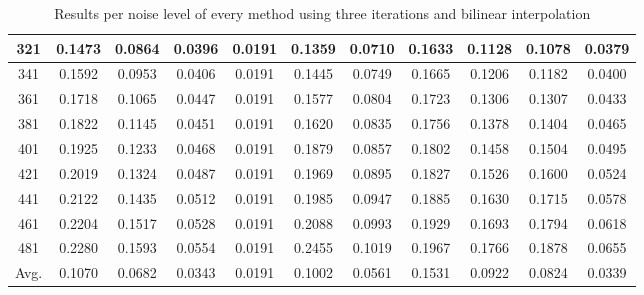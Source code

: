 \begin{table}[ht!]
\begin{tabular}{c|c|c|c|c|c|c|c|c|c|c}
321 & 0.1473 & 0.0864 & 0.0396 & 0.0191 & 0.1359 & 0.0710 & 0.1633 & 0.1128 & 0.1078 & 0.0379 \\ \hline
341 & 0.1592 & 0.0953 & 0.0406 & 0.0191 & 0.1445 & 0.0749 & 0.1665 & 0.1206 & 0.1182 & 0.0400 \\ \hline
361 & 0.1718 & 0.1065 & 0.0447 & 0.0191 & 0.1577 & 0.0804 & 0.1723 & 0.1306 & 0.1307 & 0.0433 \\ \hline
381 & 0.1822 & 0.1145 & 0.0451 & 0.0191 & 0.1620 & 0.0835 & 0.1756 & 0.1378 & 0.1404 & 0.0465 \\ \hline
401 & 0.1925 & 0.1233 & 0.0468 & 0.0191 & 0.1879 & 0.0857 & 0.1802 & 0.1458 & 0.1504 & 0.0495 \\ \hline
421 & 0.2019 & 0.1324 & 0.0487 & 0.0191 & 0.1969 & 0.0895 & 0.1827 & 0.1526 & 0.1600 & 0.0524 \\ \hline
441 & 0.2122 & 0.1435 & 0.0512 & 0.0191 & 0.1985 & 0.0947 & 0.1885 & 0.1630 & 0.1715 & 0.0578 \\ \hline
461 & 0.2204 & 0.1517 & 0.0528 & 0.0191 & 0.2088 & 0.0993 & 0.1929 & 0.1693 & 0.1794 & 0.0618 \\ \hline
481 & 0.2280 & 0.1593 & 0.0554 & 0.0191 & 0.2455 & 0.1019 & 0.1967 & 0.1766 & 0.1878 & 0.0655 \\ \hline
Avg.  & 0.1070 & 0.0682 & 0.0343 & 0.0191 & 0.1002 & 0.0561 & 0.1531 & 0.0922 & 0.0824 & 0.0339 \\ \hline
\end{tabular}
\caption{Results per noise level of every method using three iterations and bilinear interpolation}
\label{tab:3itLperNoise}
\end{table}



